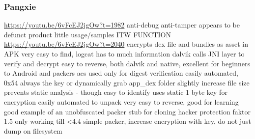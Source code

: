 \subsubsection{Pangxie}
\url{https://youtu.be/6vFcEJ2jgOw?t=1982}\newline
anti-debug\newline
anti-tamper\newline
appears to be defunct product\newline
little usage/samples ITW\newline
FUNCTION\newline
\url{https://youtu.be/6vFcEJ2jgOw?t=2040}\newline
encrypts dex file and bundles as asset in APK\newline
very easy to find, logcat has to much information\newline
dalvik calls JNI layer to verify and decrypt\newline
easy to reverse, both dalvik and native, excellent for beginners to Android and packers\newline
aes used only for digest verification\newline
easily automated, 0x54 always the key\newline
or dynamically grab app\_dex folder\newline
slightly increase file size\newline
prevents static analysis - though easy to identify\newline
uses static 1 byte key for encryption\newline
easily automated to unpack\newline
very easy to reverse, good for learning\newline
good example of an unobfuscated packer stub for cloning\newline
hacker protection faktor 1.5\newline
only working till <4.4\newline
simple packer, increase encryption with key, do not just dump on filesystem\newline

